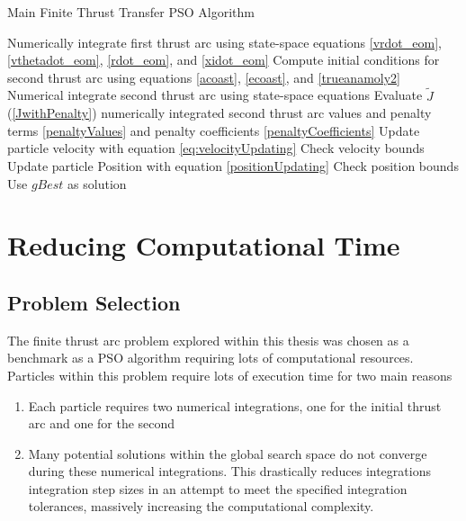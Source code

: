 \begin{algorithm}[H]
    \caption{Main Finite Thrust Transfer PSO Algorithm}
    \begin{algorithmic}

    \STATE Numerically integrate first thrust arc using state-space equations \ref{vrdot_eom},
    \ref{vthetadot_eom}, \ref{rdot_eom}, and \ref{xidot_eom}
    \STATE Compute initial conditions for second thrust arc using equations \ref{acoast}, \ref{ecoast}, and \ref{trueanamoly2}
    \STATE Numerical integrate second thrust arc using state-space equations
    \STATE Evaluate $\tilde{J}$ (\ref{JwithPenalty}) numerically integrated second thrust arc values and penalty terms \ref{penaltyValues} and
    penalty coefficients \ref{penaltyCoefficients}
    \ENDFOR
    \STATE Update particle velocity with equation \ref{eq:velocityUpdating}
    \STATE Check velocity bounds
    \STATE Update particle Position with equation \ref{positionUpdating}
    \STATE Check position bounds
    \ENDFOR
    \ENDFOR
    \STATE Use $gBest$ as solution
    \end{algorithmic}
    \label{alg:PSOfThrustMain}

\end{algorithm}

\section{Reducing Computational Time}

\subsection{Problem Selection} \label{problemSelection}
The finite thrust arc problem explored within this thesis was chosen as a benchmark as a PSO algorithm requiring 
lots of computational resources. Particles within this problem require lots of execution time for two main reasons

\begin{enumerate}
    \item Each particle requires two numerical integrations, one for the initial thrust arc and one for the second
    \item Many potential solutions within the global search space do not converge during these numerical integrations. This drastically reduces integrations
    integration step sizes in an attempt to meet the specified integration tolerances, massively increasing the computational complexity. 
\end{enumerate}

